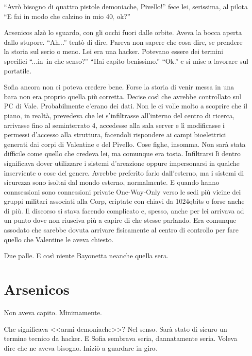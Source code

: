     ``Avrò bisogno di quattro pistole demoniache, Pivello!'' fece lei, serissima, al pilota ``E fai in modo che calzino
    in mio 40, ok?''

    Arsenicos alzò lo sguardo, con gli occhi fuori dalle orbite. Aveva la bocca aperta dallo stupore. ``Ah...'' tentò di
    dire. Pareva non sapere che cosa dire, se prendere la storia sul serio o meno. Lei era una hacker. Potevano essere
    dei termini specifici ``...in--in che senso?'' ``Hai capito benissimo.'' ``Ok.'' e si mise a lavorare sul portatile.

    Sofia ancora non ci poteva credere bene. Forse la storia di venir messa in una bara non era proprio quella più
    corretta. Decise così che avrebbe controllato sul PC di Vale. Probabilmente c'erano dei dati. Non le ci volle molto
    a scoprire che il piano, in realtà, prevedeva che lei s'infiltrasse all'interno del centro di ricerca, arrivasse
    fino al seminterrato 4, accedesse alla sala server e lì modificasse i permessi d'accesso alla struttura, facendoli
    rispondere ai campi bioelettrici generati dai corpi di Valentine e del Pivello. Cose fighe, insomma. Non sarà stata
    difficile come quello che credeva lei, ma comunque era tosta. Infiltrarsi lì dentro significava dover utilizzare i
    sistemi d'areazione oppure impersonarsi in qualche inserviente o cose del genere. Avrebbe preferito farlo
    dall'esterno, ma i sistemi di sicurezza sono isoltai dal mondo esterno, normalmente. E quando hanno connsessioni
    sono connessioni private One-Way-Only verso le sedi più vicine dei gruppi militari associati alla Corp, criptate con
    chiavi da 1024qbits o forse anche di più. Il discorso si stava facendo complicato e, spesso, anche per lei arrivava
    ad un punto dove non riusciva più a capire di che stesse parlando. Era comunque assodato che sarebbe dovuta arrivare
    fisicamente al centro di controllo per fare quello che Valentine le aveva chiesto.

    Due palle. E così niente Bayonetta neanche quella sera.

  \section*{Arsenicos}

    Non aveva capito. Minimamente.

    Che significava <<armi demoniache>>? Nel senso. Sarà stato di sicuro un termine tecnico da hacker. E Sofia sembrava
    seria, dannatamente seria. Voleva dire che ne aveva bisogno. Iniziò a guardare in giro.

